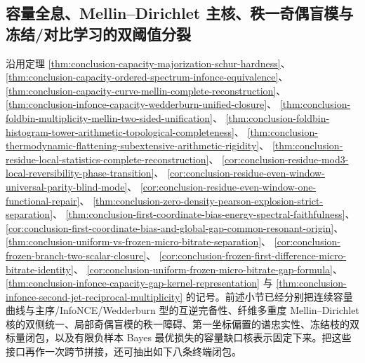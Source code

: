 \subsection{容量全息、Mellin--Dirichlet 主核、秩一奇偶盲模与冻结/对比学习的双阈值分裂}\label{subsec:conclusion-capacity-holography-parity-freezing-contrastive-bifurcation}
沿用定理
\ref{thm:conclusion-capacity-majorization-schur-hardness}、
\ref{thm:conclusion-capacity-ordered-spectrum-infonce-equivalence}、
\ref{thm:conclusion-capacity-curve-mellin-complete-reconstruction}、
\ref{thm:conclusion-infonce-capacity-wedderburn-unified-closure}、
\ref{thm:conclusion-foldbin-multiplicity-mellin-two-sided-unification}、
\ref{thm:conclusion-foldbin-histogram-tower-arithmetic-topological-completeness}、
\ref{thm:conclusion-thermodynamic-flattening-subextensive-arithmetic-rigidity}、
\ref{thm:conclusion-residue-local-statistics-complete-reconstruction}、
\ref{cor:conclusion-residue-mod3-local-reversibility-phase-transition}、
\ref{cor:conclusion-residue-even-window-universal-parity-blind-mode}、
\ref{cor:conclusion-residue-even-window-one-functional-repair}、
\ref{thm:conclusion-zero-density-pearson-explosion-strict-separation}、
\ref{thm:conclusion-first-coordinate-bias-energy-spectral-faithfulness}、
\ref{cor:conclusion-first-coordinate-bias-and-global-gap-common-resonant-origin}、
\ref{thm:conclusion-uniform-vs-frozen-micro-bitrate-separation}、
\ref{cor:conclusion-frozen-branch-two-scalar-closure}、
\ref{cor:conclusion-frozen-first-difference-micro-bitrate-identity}、
\ref{cor:conclusion-uniform-frozen-micro-bitrate-gap-formula}、
\ref{thm:conclusion-infonce-capacity-gap-kernel-representation}
与
\ref{thm:conclusion-infonce-second-jet-reciprocal-multiplicity}
的记号。前述小节已经分别把连续容量曲线与主序/InfoNCE/Wedderburn 型的互逆完备性、纤维多重度 Mellin--Dirichlet 核的双侧统一、局部奇偶盲模的秩一障碍、第一坐标偏置的谱忠实性、冻结枝的双标量闭包，以及有限负样本 Bayes 最优损失的容量缺口核表示固定下来。把这些接口再作一次跨节拼接，还可抽出如下八条终端闭包。

